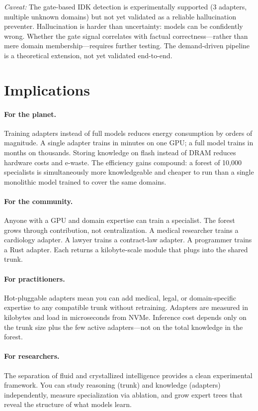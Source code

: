 \documentclass[11pt]{article}
\begin{document}
\emph{Caveat:} The gate-based IDK detection is experimentally supported
(3 adapters, multiple unknown domains) but not yet validated as a reliable
hallucination preventer. Hallucination is harder than uncertainty: models
can be confidently wrong. Whether the gate signal correlates with factual
correctness---rather than mere domain membership---requires further testing.
The demand-driven pipeline is a theoretical extension, not yet validated
end-to-end.

\section{Implications}

\paragraph{For the planet.}
Training adapters instead of full models reduces energy consumption by
orders of magnitude. A single adapter trains in minutes on one GPU;
a full model trains in months on thousands. Storing knowledge on flash
instead of DRAM reduces hardware costs and e-waste. The efficiency gains
compound: a forest of 10,000 specialists is simultaneously more
knowledgeable and cheaper to run than a single monolithic model trained
to cover the same domains.

\paragraph{For the community.}
Anyone with a GPU and domain expertise can train a specialist. The forest
grows through contribution, not centralization. A medical researcher trains
a cardiology adapter. A lawyer trains a contract-law adapter. A programmer
trains a Rust adapter. Each returns a kilobyte-scale module that plugs into
the shared trunk.

\paragraph{For practitioners.}
Hot-pluggable adapters mean you can add medical, legal, or domain-specific
expertise to any compatible trunk without retraining. Adapters are measured
in kilobytes and load in microseconds from NVMe. Inference cost depends
only on the trunk size plus the few active adapters---not on the total
knowledge in the forest.

\paragraph{For researchers.}
The separation of fluid and crystallized intelligence provides a clean
experimental framework. You can study reasoning (trunk) and knowledge
(adapters) independently, measure specialization via ablation, and grow
expert trees that reveal the structure of what models learn.
\end{document}
